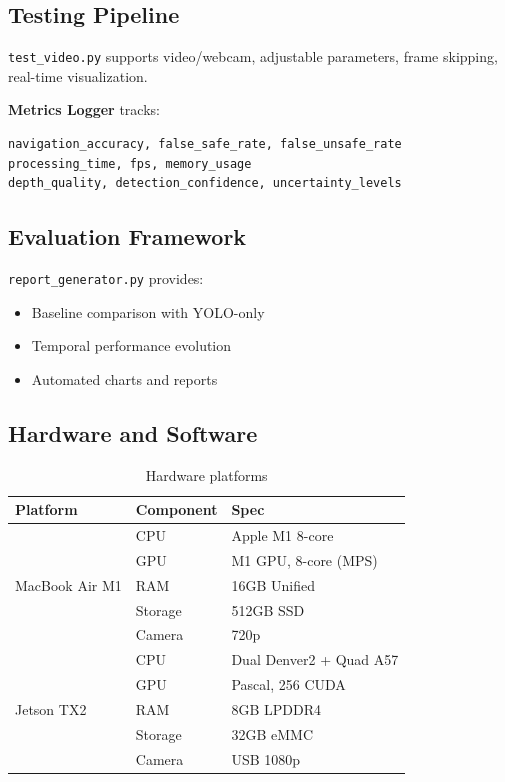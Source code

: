 \documentclass[12pt,oneside]{book}
\begin{document}
\subsection{Testing Pipeline}

\texttt{test\_video.py} supports video/webcam, adjustable parameters, frame skipping, real-time visualization.

\textbf{Metrics Logger} tracks:
\begin{verbatim}
navigation_accuracy, false_safe_rate, false_unsafe_rate
processing_time, fps, memory_usage
depth_quality, detection_confidence, uncertainty_levels
\end{verbatim}

\subsection{Evaluation Framework}

\texttt{report\_generator.py} provides:
\begin{itemize}
\item Baseline comparison with YOLO-only
\item Temporal performance evolution
\item Automated charts and reports
\end{itemize}

\subsection{Hardware and Software}

\begin{table}[ht]
\centering
\caption{Hardware platforms}
\label{tab:hardware_config}
\begin{tabular}{@{}lll@{}}
\toprule
\textbf{Platform} & \textbf{Component} & \textbf{Spec} \\
\midrule
\multirow{5}{*}{MacBook Air M1} & CPU & Apple M1 8-core \\
 & GPU & M1 GPU, 8-core (MPS) \\
 & RAM & 16GB Unified \\
 & Storage & 512GB SSD \\
 & Camera & 720p \\
\midrule
\multirow{5}{*}{Jetson TX2} & CPU & Dual Denver2 + Quad A57 \\
 & GPU & Pascal, 256 CUDA \\
 & RAM & 8GB LPDDR4 \\
 & Storage & 32GB eMMC \\
 & Camera & USB 1080p \\
\bottomrule
\end{tabular}
\end{table}
\end{document}
